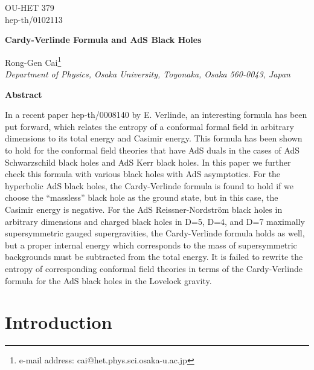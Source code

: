 \documentclass[a4paper,12pt]{article}
\newcommand{\sect}[1]{\setcounter{equation}{0}\section{#1}}
\begin{document}
\topmargin 0pt
\oddsidemargin 0mm

\renewcommand{\thefootnote}{\fnsymbol{footnote}}
\begin{titlepage}
\begin{flushright}
OU-HET 379\\
hep-th/0102113
\end{flushright}

\vspace{5mm}
\begin{center}
{\Large \bf Cardy-Verlinde Formula and AdS Black Holes}
\vspace{12mm}

{\large
Rong-Gen Cai\footnote{e-mail address: cai@het.phys.sci.osaka-u.ac.jp}
} \\
\vspace{8mm}
{\em Department of Physics, Osaka University,
Toyonaka, Osaka 560-0043, Japan} 
\end{center}
\vspace{5mm}
\centerline{{\bf{Abstract}}}
\vspace{5mm}
In a recent paper hep-th/0008140 by E. Verlinde, an interesting formula has 
been put forward, which relates the entropy of a conformal formal field in 
arbitrary dimensions to its total energy and Casimir energy. This formula has
been shown to hold for the conformal field theories that have AdS duals 
in the cases of AdS Schwarzschild black holes and AdS Kerr black holes. In
this paper we further check this formula with various black holes with AdS
asymptotics.  For the hyperbolic AdS black holes, the Cardy-Verlinde formula
is found to hold if we choose the ``massless'' black hole as the ground state,
 but in this case, the Casimir energy is negative. For the AdS 
Reissner-Nordstr\"om black holes in arbitrary dimensions and charged black 
holes in D=5, D=4, and D=7 maximally supersymmetric gauged supergravities,
the Cardy-Verlinde formula holds as well, but a proper internal energy which 
corresponds to the mass of supersymmetric backgrounds must be subtracted from 
the total energy. It is failed to rewrite the entropy of corresponding 
conformal field theories in terms of the Cardy-Verlinde formula for the AdS 
black holes in the Lovelock gravity.   

\end{titlepage}

\newpage
\renewcommand{\thefootnote}{\arabic{footnote}}
\setcounter{footnote}{0}
\setcounter{page}{2}


\sect{Introduction}
\end{document}
